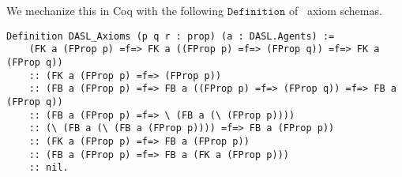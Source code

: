 
We mechanize this in Coq with the following $\mathtt{Definition}$ of \DASL\ axiom schemas.

\begin{tcolorbox}
		\begin{lstlisting}[language=Coq]
	Definition DASL_Axioms (p q r : prop) (a : DASL.Agents) := 
	(FK a (FProp p) =f=> FK a ((FProp p) =f=> (FProp q)) =f=> FK a (FProp q))
	:: (FK a (FProp p) =f=> (FProp p))
	:: (FB a (FProp p) =f=> FB a ((FProp p) =f=> (FProp q)) =f=> FB a (FProp q))
	:: (FB a (FProp p) =f=> \ (FB a (\ (FProp p))))
	:: (\ (FB a (\ (FB a (FProp p)))) =f=> FB a (FProp p))
	:: (FK a (FProp p) =f=> FB a (FProp p))
	:: (FB a (FProp p) =f=> FB a (FK a (FProp p)))
	:: nil.
	\end{lstlisting}
\end{tcolorbox}

